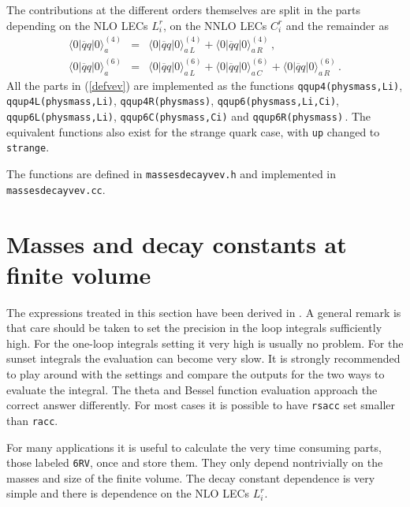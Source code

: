 \documentclass[12pt,a4paper]{article}
\begin{document}
The contributions at the different orders themselves are split in the parts
depending on the NLO LECs $L_i^r$, on the NNLO LECs $C_i^r$ and the
remainder as
\begin{eqnarray}
\label{defvev}
\langle0\vert \overline q q \vert 0\rangle_a^{(4)}&=&
\langle0\vert \overline q q \vert 0\rangle_{a\,L}^{(4)}
+\langle0\vert \overline q q \vert 0\rangle_{a\,R}^{(4)}\,,
\nonumber\\
\langle0\vert \overline q q \vert 0\rangle_a^{(6)}&=&
\langle0\vert \overline q q \vert 0\rangle_{a\,L}^{(6)}
+\langle0\vert \overline q q \vert 0\rangle_{a\,C}^{(6)}
+\langle0\vert \overline q q \vert 0\rangle_{a\,R}^{(6)}\,.
\end{eqnarray}
All the parts in (\ref{defvev}) are implemented as the functions
\texttt{qqup4(physmass,Li)},\\ \texttt{qqup4L(physmass,Li)}, 
\texttt{qqup4R(physmass)}, \texttt{qqup6(physmass,Li,Ci)},\\
\texttt{qqup6L(physmass,Li)}, \texttt{qqup6C(physmass,Ci)}
and \texttt{qqup6R(physmass)}\,. The equivalent functions also exist 
for the strange quark case, with \texttt{up} changed to \texttt{strange}.

The functions are defined in \texttt{massesdecayvev.h} and
implemented in \texttt{massesdecayvev.cc}.

\section{Masses and decay constants at finite volume}
\label{massdecayvevV}

The expressions treated in this section have been
derived in \cite{Bijnens:2014dea}. A general remark is that care should be
taken to set the precision in the loop integrals sufficiently high.
For the one-loop integrals setting it very high is usually no problem.
For the sunset integrals the evaluation can become very slow. It is
strongly recommended to play around with the settings and compare the outputs
for the two ways to evaluate the integral. 
The theta and Bessel function evaluation approach the correct answer
differently.
For most cases
it is possible to have \texttt{rsacc} set smaller than \texttt{racc}.

For many applications it is useful to calculate the
very time consuming parts, those labeled \texttt{6RV}, once and store them.
They only depend nontrivially on the masses and size of the finite volume.
The decay constant dependence is very simple and there is dependence
on the NLO LECs $L_i^r$.
\end{document}
